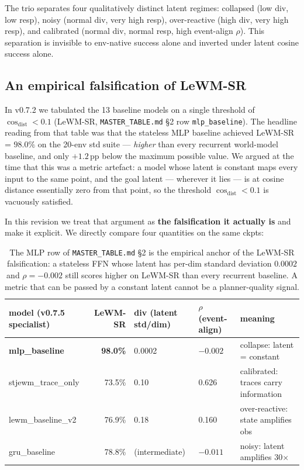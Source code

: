 \documentclass{article}
\begin{document}
The trio separates four qualitatively distinct latent regimes: collapsed (low div, low resp), noisy (normal div, very high resp), over-reactive (high div, very high resp), and calibrated (normal div, normal resp, high event-align $\rho$). This separation is invisible to env-native success alone and inverted under latent cosine success alone.


\subsection{An empirical falsification of LeWM-SR}

In v0.7.2 we tabulated the 13 baseline models on a single threshold of
$\cos_{\mathrm{dist}} < 0.1$ (LeWM-SR, \texttt{MASTER\_TABLE.md} \S2 row \texttt{mlp\_baseline}). The headline reading from that table was that the stateless MLP baseline achieved LeWM-SR = $98.0\%$ on the 20-env std suite --- \emph{higher} than every recurrent world-model baseline, and only $+1.2$\,pp below the maximum possible value. We argued at the time that this was a metric artefact: a model whose latent is constant maps every input to the same point, and the goal latent --- wherever it lies --- is at cosine distance essentially zero from that point, so the threshold $\cos_{\mathrm{dist}} < 0.1$ is vacuously satisfied.

In this revision we treat that argument as \textbf{the falsification it actually is} and make it explicit. We directly compare four quantities on the same ckpts:

\begin{table}[ht]
\centering
\small
\begin{tabular}{lrlll}
\toprule
model (v0.7.5 specialist) & LeWM-SR & div (latent std/dim) & $\rho$ (event-align) & meaning \\
\midrule
\textbf{mlp\_baseline}        & \textbf{98.0\%} & 0.0002                 & $-0.002$            & collapse: latent = constant \\
stjewm\_trace\_only       & 73.5\%           & 0.10                   & 0.626               & calibrated: traces carry information \\
lewm\_baseline\_v2        & 76.9\%           & 0.18                   & 0.160               & over-reactive: state amplifies obs \\
gru\_baseline             & 78.8\%           & (intermediate)        & $-0.011$            & noisy: latent amplifies 30$\times$ \\
\bottomrule
\end{tabular}
\caption{The MLP row of \texttt{MASTER\_TABLE.md} \S2 is the empirical anchor of the LeWM-SR falsification: a stateless FFN whose latent has per-dim standard deviation $0.0002$ and $\rho = -0.002$ still scores higher on LeWM-SR than every recurrent baseline. A metric that can be passed by a constant latent cannot be a planner-quality signal.}
\end{table}
\end{document}
